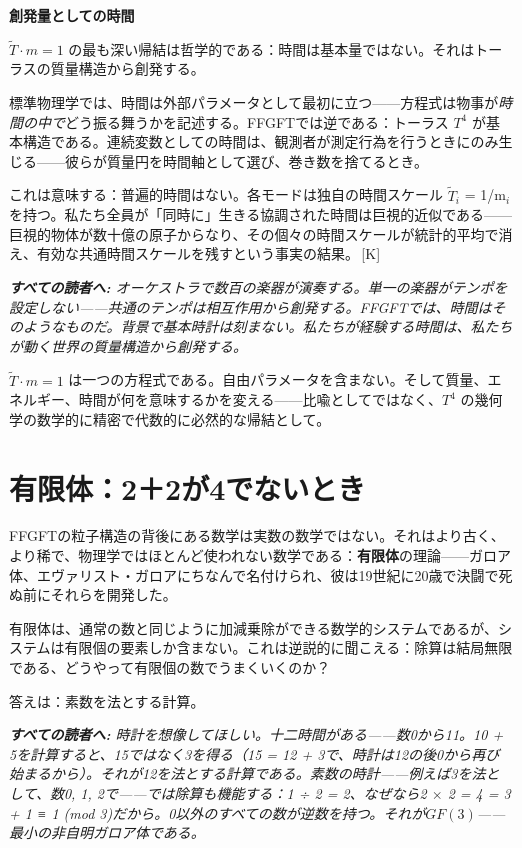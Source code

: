 \documentclass[11pt,openany]{book}
\newcommand{\status}[1]{\penalty10000\,{\tiny\textcolor{gray!70}{[#1]}}}
\newenvironment{laierspur}{%
  \par\vspace{4pt}%
  \noindent\small\itshape\color{blue!60!black}%
  \textbf{すべての読者へ:}\enspace\ignorespaces}{%
  \par\vspace{4pt}\normalsize\normalfont\normalcolor}
\begin{document}
\textbf{創発量としての時間}

$\tilde{T}\cdot m = 1$ の最も深い帰結は哲学的である：時間は基本量ではない。それはトーラスの質量構造から創発する。

標準物理学では、時間は外部パラメータとして最初に立つ——方程式は物事が\textit{時間の中で}どう振る舞うかを記述する。FFGFTでは逆である：トーラス $T^4$ が基本構造である。連続変数としての時間は、観測者が測定行為を行うときにのみ生じる——彼らが質量円を時間軸として選び、巻き数を捨てるとき。

これは意味する：普遍的時間はない。各モードは独自の時間スケール $\tilde{T}_i$ = 1/m$_i$ を持つ。私たち全員が「同時に」生きる協調された時間は巨視的近似である——巨視的物体が数十億の原子からなり、その個々の時間スケールが統計的平均で消え、有効な共通時間スケールを残すという事実の結果。\status{K}

\begin{laierspur}
オーケストラで数百の楽器が演奏する。単一の楽器がテンポを設定しない——共通のテンポは相互作用から創発する。FFGFTでは、時間はそのようなものだ。背景で基本時計は刻まない。私たちが経験する時間は、私たちが動く世界の質量構造から創発する。
\end{laierspur}

$\tilde{T}\cdot m = 1$ は一つの方程式である。自由パラメータを含まない。そして質量、エネルギー、時間が何を意味するかを変える——比喩としてではなく、$T^4$ の幾何学の数学的に精密で代数的に必然的な帰結として。

\medskip

\chapter{有限体：2＋2が4でないとき}

FFGFTの粒子構造の背後にある数学は実数の数学ではない。それはより古く、より稀で、物理学ではほとんど使われない数学である：\textbf{有限体}の理論——ガロア体、エヴァリスト・ガロアにちなんで名付けられ、彼は19世紀に20歳で決闘で死ぬ前にそれらを開発した。

有限体は、通常の数と同じように加減乗除ができる数学的システムであるが、システムは有限個の要素しか含まない。これは逆説的に聞こえる：除算は結局無限である、どうやって有限個の数でうまくいくのか？

答えは：素数を法とする計算。

\begin{laierspur}
時計を想像してほしい。十二時間がある——数0から11。10 + 5を計算すると、15ではなく3を得る（15 = 12 + 3で、時計は12の後0から再び始まるから）。それが12を法とする計算である。素数の時計——例えば3を法として、数{0, 1, 2}で——では除算も機能する：1 ÷ 2 = 2、なぜなら2 $\times$ 2 = 4 = 3 + 1 ≡ 1 (mod 3)だから。0以外のすべての数が逆数を持つ。それが$GF(3)$——最小の非自明ガロア体である。
\end{laierspur}
\end{document}
